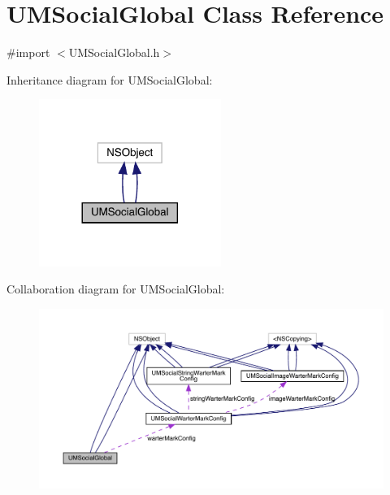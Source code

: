 \hypertarget{interface_u_m_social_global}{}\section{U\+M\+Social\+Global Class Reference}
\label{interface_u_m_social_global}


{\ttfamily \#import $<$U\+M\+Social\+Global.\+h$>$}



Inheritance diagram for U\+M\+Social\+Global\+:\nopagebreak
\begin{figure}[H]
\begin{center}
\leavevmode
\includegraphics[width=168pt]{interface_u_m_social_global__inherit__graph}
\end{center}
\end{figure}


Collaboration diagram for U\+M\+Social\+Global\+:\nopagebreak
\begin{figure}[H]
\begin{center}
\leavevmode
\includegraphics[width=350pt]{interface_u_m_social_global__coll__graph}
\end{center}
\end{figure}
